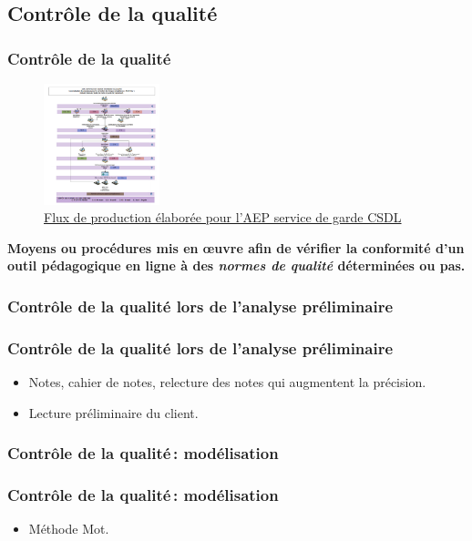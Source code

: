 				\subsection{Contrôle de la qualité} 
						\begin{frame}[allowframebreaks]
						\frametitle{Contrôle de la qualité}
                        			\begin{figure}
                     			\centering
                    			 \includegraphics[width = 0.30\textwidth]{flux.png}
                     			\caption{\tiny{\href{run:flux.png}{Flux de production élaborée pour l'AEP service de garde CSDL}}}
                   			\end{figure}
                        			\textbf{Moyens ou procédures mis en œuvre afin de vérifier la conformité d’un outil pédagogique en ligne à des \textit{normes de qualité} déterminées ou pas.}
						
						\end{frame}
						
					\subsubsection{Contrôle de la qualité lors de l'analyse préliminaire} 
							\begin{frame}
							\frametitle{Contrôle de la qualité lors de l'analyse préliminaire}
                        				
							\begin{itemize}
							
							\item Notes, cahier de notes, relecture des notes qui augmentent la précision.
							\item Lecture préliminaire du client. 
												
							\end{itemize}						
					\end{frame}	
					\subsubsection{Contrôle de la qualité\,: modélisation} 
							\begin{frame}[allowframebreaks]
							\frametitle{Contrôle de la qualité\,: modélisation}
                        			
							\begin{itemize}
							\item Méthode Mot.
							\end{itemize}						
					\end{frame}	
					
